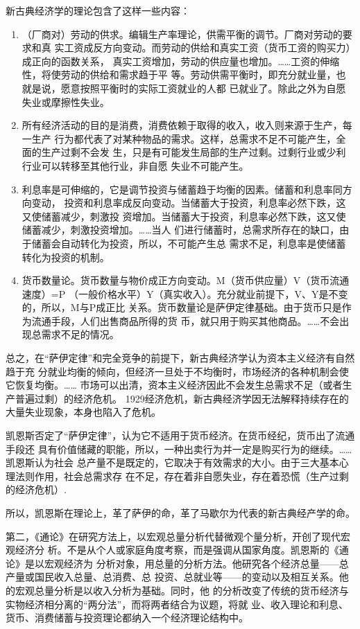 新古典经济学的理论包含了这样一些内容：
\begin{enumerate}
\item （厂商对）劳动的供求。编辑生产率理论，供需平衡的调节。厂商对劳动的要求和真
  实工资成反方向变动。而劳动的供给和真实工资（货币工资的购买力）成正向的函数关系，
  真实工资增加，劳动的供应量也增加。……工资的伸缩性，将使劳动的供给和需求趋于平
  等。劳动供需平衡时，即充分就业量，也就是说，愿意按照平衡时的实际工资就业的人都
  已就业了。除此之外为自愿失业或摩擦性失业。


\item 所有经济活动的目的是消费，消费依赖于取得的收入，收入则来源于生产，每一生产
  行为都代表了对某种物品的需求。这样，总需求不足不可能产生，全面的生产过剩不会发
  生，只是有可能发生局部的生产过剩。过剩行业或少利行业可以转移至其他行业，非自愿
  失业不可能产生。


\item 利息率是可伸缩的，它是调节投资与储蓄趋于均衡的因素。储蓄和利息率同方向变动，
  投资和利息率成反向变动。当储蓄大于投资，利息率必然下跌，这又使储蓄减少，刺激投
  资增加。当储蓄大于投资，利息率必然下跌，这又使储蓄减少，刺激投资增加。……当人
  们进行储蓄时，总需求所存在的缺口，由于储蓄会自动转化为投资，所以，不可能产生总
  需求不足，利息率是使储蓄转化为投资的机制。


\item 货币数量论。货币数量与物价成正方向变动。M（货币供应量）V（货币流通速度）=P
  （一般价格水平）Y（真实收入）。充分就业前提下，V、Y是不变的，所以，M与P成正比
  关系。货币数量论是萨伊定律基础。由于货币只是作为流通手段，人们出售商品所得的货
  币，就只用于购买其他商品。……不会出现总需求不足的情况。

\end{enumerate}
总之，在“萨伊定律”和完全竞争的前提下，新古典经济学认为资本主义经济有自然趋于充
分就业均衡的倾向，但经济一旦处于不均衡时，市场经济的各种机制会使它恢复均衡。……
市场可以出清，资本主义经济因此不会发生总需求不足（或者生产普遍过剩）的经济危机。
1929经济危机，新古典经济学因无法解释持续存在的大量失业现象，本身也陷入了危机。

凯恩斯否定了“萨伊定律”，认为它不适用于货币经济。在货币经纪，货币出了流通手段还
具有价值储藏的职能，所以，一种出卖行为并一定是购买行为的继续。……凯恩斯认为社会
总产量不是既定的，它取决于有效需求的大小。由于三大基本心理法则作用，社会总需求存
在不足，存在着非自愿失业，存在着恐慌（生产过剩的经济危机）.

所以，凯恩斯在理论上，革了萨伊的命，革了马歇尔为代表的新古典经产学的命。

第二，《通论》在研究方法上，以宏观总量分析代替微观个量分析，开创了现代宏观经济分
析。不是从个人或家庭角度考察，而是强调从国家角度。凯恩斯的《通论》是以宏观经济为
分析对象，用总量的分析方法。他研究各个经济总量——总产量或国民收入总量、总消费、总
投资、总就业等——的变动以及相互关系。他的宏观总量分析是以收入分析为基础。同时，他
的分析改变了传统的货币经济与实物经济相分离的“两分法”，而将两者结合为议题，将就
业、收入理论和利息、货币、消费储蓄与投资理论都纳入一个经济理论结构中。

